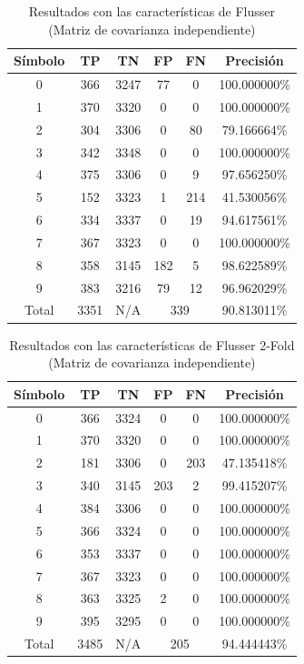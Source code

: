 \documentclass[a4paper, 11pt, oneside]{report}
\begin{document}
\begin{table}
\centering
\begin{tabular}{|c|c|c|c|c|c|}
\hline
Símbolo & TP & TN & FP & FN & Precisión \\ 
\hline
0 & 366 & 3247 & 77 & 0 & 100.000000\% \\ 
1 & 370 & 3320 & 0 & 0 & 100.000000\% \\ 
2 & 304 & 3306 & 0 & 80 & 79.166664\% \\ 
3 & 342 & 3348 & 0 & 0 & 100.000000\% \\ 
4 & 375 & 3306 & 0 & 9 & 97.656250\% \\ 
5 & 152 & 3323 & 1 & 214 & 41.530056\% \\ 
6 & 334 & 3337 & 0 & 19 & 94.617561\% \\ 
7 & 367 & 3323 & 0 & 0 & 100.000000\% \\ 
8 & 358 & 3145 & 182 & 5 & 98.622589\% \\ 
9 & 383 & 3216 & 79 & 12 & 96.962029\% \\ 
\hline
Total & 3351 & N/A & \multicolumn{2}{|c|}{339} & 90.813011\% \\
\hline
\end{tabular}
\caption{Resultados con las características de Flusser (Matriz de covarianza independiente)}
\label{tb:numFlIndep}
\end{table}
\begin{table}
\centering
\begin{tabular}{|c|c|c|c|c|c|}
\hline
Símbolo & TP & TN & FP & FN & Precisión \\ 
\hline
0 & 366 & 3324 & 0 & 0 & 100.000000\% \\ 
1 & 370 & 3320 & 0 & 0 & 100.000000\% \\ 
2 & 181 & 3306 & 0 & 203 & 47.135418\% \\ 
3 & 340 & 3145 & 203 & 2 & 99.415207\% \\ 
4 & 384 & 3306 & 0 & 0 & 100.000000\% \\ 
5 & 366 & 3324 & 0 & 0 & 100.000000\% \\ 
6 & 353 & 3337 & 0 & 0 & 100.000000\% \\ 
7 & 367 & 3323 & 0 & 0 & 100.000000\% \\ 
8 & 363 & 3325 & 2 & 0 & 100.000000\% \\ 
9 & 395 & 3295 & 0 & 0 & 100.000000\% \\ 
\hline
Total & 3485 & N/A & \multicolumn{2}{|c|}{205} & 94.444443\% \\
\hline
\end{tabular}
\caption{Resultados con las características de Flusser 2-Fold (Matriz de covarianza independiente)}
\label{tb:numRotIndep}
\end{table}
\end{document}

